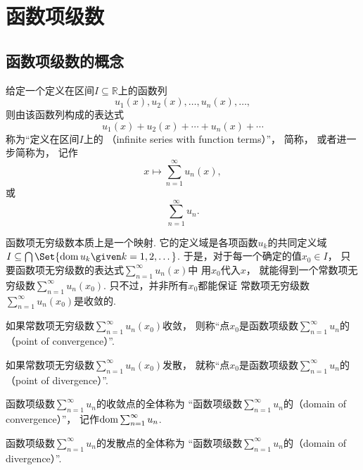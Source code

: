 \section{函数项级数}
\subsection{函数项级数的概念}
\begin{definition}\label{definition:无穷级数.实函数项级数的概念}
给定一个定义在区间\(I \subseteq \mathbb{R}\)上的函数列\[
	u_1(x),u_2(x),\dotsc,u_n(x),\dotsc,
\]
则由该函数列构成的表达式\[
	u_1(x)+u_2(x)+\dotsb+u_n(x)+\dotsb
\]
称为“定义在区间\(I\)上的
（infinite series with function terms）”，
简称，
或者进一步简称为，
记作\[
	x \mapsto \sum_{n=1}^\infty u_n(x),
\]
或\[
	\sum_{n=1}^\infty u_n.
\]
\end{definition}
\begin{remark}
函数项无穷级数本质上是一个映射.
它的定义域是各项函数\(u_k\)的共同定义域
\(I \subseteq \bigcap\Set{ \dom u_k \given k=1,2,\dotsc }\).
于是，对于每一个确定的值\(x_0 \in I\)，
只要函数项无穷级数的表达式\(\sum_{n=1}^\infty u_n(x)\)中
用\(x_0\)代入\(x\)，
就能得到一个常数项无穷级数\(\sum_{n=1}^\infty u_n(x_0)\).
只不过，并非所有\(x_0\)都能保证
常数项无穷级数\(\sum_{n=1}^\infty u_n(x_0)\)是收敛的.
\end{remark}

\begin{definition}
如果常数项无穷级数\(\sum_{n=1}^\infty u_n(x_0)\)收敛，
则称“点\(x_0\)是函数项级数\(\sum_{n=1}^\infty u_n\)的
（point of convergence）”.

如果常数项无穷级数\(\sum_{n=1}^\infty u_n(x_0)\)发散，
就称“点\(x_0\)是函数项级数\(\sum_{n=1}^\infty u_n\)的
（point of divergence）”.

函数项级数\(\sum_{n=1}^\infty u_n\)的收敛点的全体称为
“函数项级数\(\sum_{n=1}^\infty u_n\)的（domain of convergence）”，
记作\(\operatorname{dom} \sum_{n=1}^\infty u_n\).

函数项级数\(\sum_{n=1}^\infty u_n\)的发散点的全体称为
“函数项级数\(\sum_{n=1}^\infty u_n\)的（domain of divergence）”.
\end{definition}

